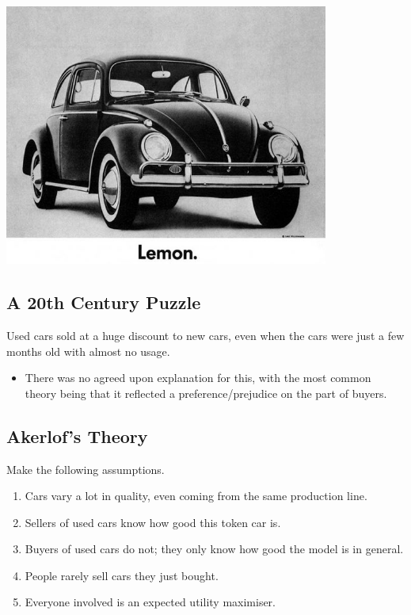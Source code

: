 \documentclass[
  letterpaper,
  DIV=11,
  numbers=noendperiod]{scrartcl}
\providecommand{\tightlist}{%
  \setlength{\itemsep}{0pt}\setlength{\parskip}{0pt}}\usepackage{longtable,booktabs,array}
\begin{document}
\includegraphics[width=0.8\textwidth,height=0.8\textheight]{vw.jpeg}

\subsection{A 20th Century Puzzle}\label{a-20th-century-puzzle}

Used cars sold at a huge discount to new cars, even when the cars were
just a few months old with almost no usage.

\begin{itemize}
\tightlist
\item
  There was no agreed upon explanation for this, with the most common
  theory being that it reflected a preference/prejudice on the part of
  buyers.
\end{itemize}

\subsection{Akerlof's Theory}\label{akerlofs-theory}

Make the following assumptions.

\begin{enumerate}
\def\labelenumi{\arabic{enumi}.}
\tightlist
\item
  Cars vary a lot in quality, even coming from the same production line.
\item
  Sellers of used cars know how good this token car is.
\item
  Buyers of used cars do not; they only know how good the model is in
  general.
\item
  People rarely sell cars they just bought.
\item
  Everyone involved is an expected utility maximiser.
\end{enumerate}
\end{document}
